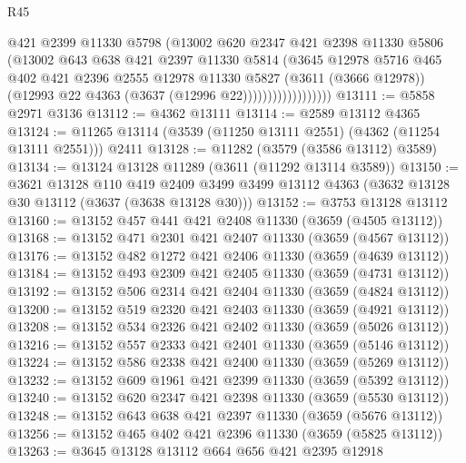 \begin{lexlean}{R45}
\begin{coremodule}
                            @421
                            @2399
                            @11330
                            @5798
                            (@13002
                              @620
                              @2347
                              @421
                              @2398
                              @11330
                              @5806
                              (@13002
                                @643
                                @638
                                @421
                                @2397
                                @11330
                                @5814
                                (@3645
                                  @12978
                                  @5716
                                  @465
                                  @402
                                  @421
                                  @2396
                                  @2555
                                  @12978
                                  @11330
                                  @5827
                                  (@3611 (@3666 @12978))
                                  (@12993 @22 @4363 (@3637 (@12996 @22))))))))))))))))))
@13111 := @5858 @2971 @3136
@13112 := @4362 @13111
@13114 := @2589 @13112 @4365
@13124 := @11265 @13114 (@3539 (@11250 @13111 @2551) (@4362 (@11254 @13111 @2551))) @2411
@13128 := @11282 (@3579 (@3586 @13112) @3589)
@13134 := @13124 @13128 @11289 (@3611 (@11292 @13114 @3589))
@13150 := @3621
    @13128
    @110
    @419
    @2409
    @3499
    @3499
    @13112
    @4363
    (@3632 @13128 @30 @13112 (@3637 (@3638 @13128 @30)))
@13152 := @3753 @13128 @13112
@13160 := @13152 @457 @441 @421 @2408 @11330 (@3659 (@4505 @13112))
@13168 := @13152 @471 @2301 @421 @2407 @11330 (@3659 (@4567 @13112))
@13176 := @13152 @482 @1272 @421 @2406 @11330 (@3659 (@4639 @13112))
@13184 := @13152 @493 @2309 @421 @2405 @11330 (@3659 (@4731 @13112))
@13192 := @13152 @506 @2314 @421 @2404 @11330 (@3659 (@4824 @13112))
@13200 := @13152 @519 @2320 @421 @2403 @11330 (@3659 (@4921 @13112))
@13208 := @13152 @534 @2326 @421 @2402 @11330 (@3659 (@5026 @13112))
@13216 := @13152 @557 @2333 @421 @2401 @11330 (@3659 (@5146 @13112))
@13224 := @13152 @586 @2338 @421 @2400 @11330 (@3659 (@5269 @13112))
@13232 := @13152 @609 @1961 @421 @2399 @11330 (@3659 (@5392 @13112))
@13240 := @13152 @620 @2347 @421 @2398 @11330 (@3659 (@5530 @13112))
@13248 := @13152 @643 @638 @421 @2397 @11330 (@3659 (@5676 @13112))
@13256 := @13152 @465 @402 @421 @2396 @11330 (@3659 (@5825 @13112))
@13263 := @3645 @13128 @13112 @664 @656 @421 @2395 @12918

\end{coremodule}
\end{lexlean}
